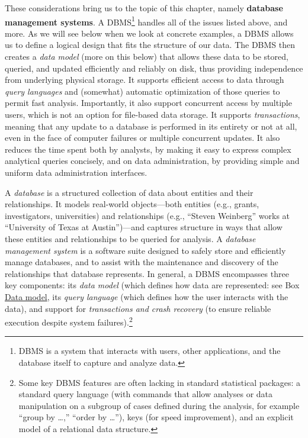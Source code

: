 \documentclass[]{krantz}
\begin{document}
These considerations bring us to the topic of this chapter, namely
\textbf{database management systems}. A DBMS\footnote{DBMS is a system
  that interacts with users, other applications, and the database itself
  to capture and analyze data.} handles all of the issues listed above,
and more. As we will see below when we look at concrete examples, a DBMS
allows us to define a logical design that fits the structure of our
data. The DBMS then creates a \emph{data model} (more on this below)
that allows these data to be stored, queried, and updated efficiently
and reliably on disk, thus providing independence from underlying
physical storage. It supports efficient access to data through
\emph{query languages} and (somewhat) automatic optimization of those
queries to permit fast analysis. Importantly, it also support concurrent
access by multiple users, which is not an option for file-based data
storage. It supports \emph{transactions}, meaning that any update to a
database is performed in its entirety or not at all, even in the face of
computer failures or multiple concurrent updates. It also reduces the
time spent both by analysts, by making it easy to express complex
analytical queries concisely, and on data administration, by providing
simple and uniform data administration interfaces.

A \emph{database} is a structured collection of data about entities and
their relationships. It models real-world objects---both entities (e.g.,
grants, investigators, universities) and relationships (e.g., ``Steven
Weinberg'' works at ``University of Texas at Austin'')---and captures
structure in ways that allow these entities and relationships to be
queried for analysis. A \emph{database management system} is a software
suite designed to safely store and efficiently manage databases, and to
assist with the maintenance and discovery of the relationships that
database represents. In general, a DBMS encompasses three key
components: its \emph{data model} (which defines how data are
represented: see Box \protect\hyperlink{box:db1}{Data model}, its
\emph{query language} (which defines how the user interacts with the
data), and support for \emph{transactions and crash recovery} (to ensure
reliable execution despite system failures).\footnote{Some key DBMS
  features are often lacking in standard statistical packages: a
  standard query language (with commands that allow analyses or data
  manipulation on a subgroup of cases defined during the analysis, for
  example ``group by \ldots{},'' ``order by \ldots{}''), keys (for speed
  improvement), and an explicit model of a relational data structure.}
\end{document}
